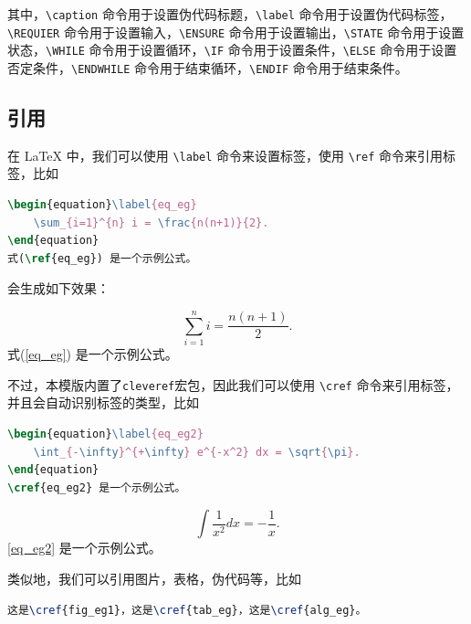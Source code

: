 其中，\texttt{\textbackslash caption} 命令用于设置伪代码标题，\texttt{\textbackslash label} 命令用于设置伪代码标签，\texttt{\textbackslash REQUIER} 命令用于设置输入，\texttt{\textbackslash ENSURE} 命令用于设置输出，\texttt{\textbackslash STATE} 命令用于设置状态，\texttt{\textbackslash WHILE} 命令用于设置循环，\texttt{\textbackslash IF} 命令用于设置条件，\texttt{\textbackslash ELSE} 命令用于设置否定条件，\texttt{\textbackslash ENDWHILE} 命令用于结束循环，\texttt{\textbackslash ENDIF} 命令用于结束条件。

\subsection{引用}

在 LaTeX 中，我们可以使用 \texttt{\textbackslash label} 命令来设置标签，使用 \texttt{\textbackslash ref} 命令来引用标签，比如

\begin{lstlisting}[language=TeX]
\begin{equation}\label{eq_eg}
    \sum_{i=1}^{n} i = \frac{n(n+1)}{2}.
\end{equation}
式(\ref{eq_eg}) 是一个示例公式。
\end{lstlisting}

\noindent 会生成如下效果：

\begin{equation}\label{eq_eg}
    \sum_{i=1}^{n} i = \frac{n(n+1)}{2}.
\end{equation}
式(\ref{eq_eg}) 是一个示例公式。

不过，本模版内置了\texttt{cleveref}宏包，因此我们可以使用 \texttt{\textbackslash cref} 命令来引用标签，并且会自动识别标签的类型，比如

\begin{lstlisting}[language=TeX]
\begin{equation}\label{eq_eg2}
    \int_{-\infty}^{+\infty} e^{-x^2} dx = \sqrt{\pi}.
\end{equation}
\cref{eq_eg2} 是一个示例公式。
\end{lstlisting}

\begin{equation}\label{eq_eg2}
    \int \frac{1}{x^2} dx = -\frac{1}{x}.
\end{equation}
\cref{eq_eg2} 是一个示例公式。

类似地，我们可以引用图片，表格，伪代码等，比如

\begin{lstlisting}[language=TeX]
这是\cref{fig_eg1}，这是\cref{tab_eg}，这是\cref{alg_eg}。
\end{lstlisting}

